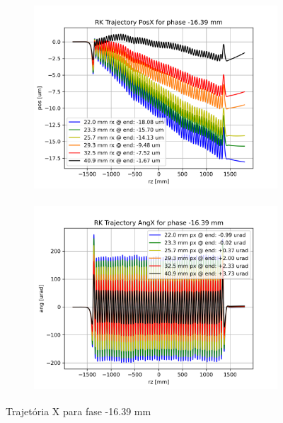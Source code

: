 \documentclass[a4paper,12pt]{article}
\begin{document}
\begin{figure}[H]
\begin{subfigure}{0.5\textwidth}
\includegraphics[width=0.9\linewidth, height=7cm]{figs/phase-16 RK Posx.png} 
\label{fig:subim1-16tx}
\end{subfigure}
\begin{subfigure}{0.5\textwidth}
\includegraphics[width=0.9\linewidth, height=7cm]{figs/phase-16 RK Angx.png}
\label{fig:subim2-16tx}
\end{subfigure}
\caption{Trajetória X para fase -16.39 mm}
\label{fig:trajx-16}
\end{figure}
\end{document}
